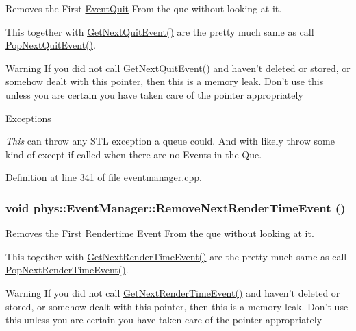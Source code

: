 Removes the First \hyperlink{classphys_1_1EventQuit}{EventQuit} From the que without looking at it. 

This together with \hyperlink{classphys_1_1EventManager_ad7da09e5422b1db79ac4187ee9198d0c}{GetNextQuitEvent()} are the pretty much same as call \hyperlink{classphys_1_1EventManager_a9b0d8e4d76fef35423bb862d7127b747}{PopNextQuitEvent()}. \begin{DoxyWarning}{Warning}
If you did not call \hyperlink{classphys_1_1EventManager_ad7da09e5422b1db79ac4187ee9198d0c}{GetNextQuitEvent()} and haven't deleted or stored, or somehow dealt with this pointer, then this is a memory leak. Don't use this unless you are certain you have taken care of the pointer appropriately 
\end{DoxyWarning}

\begin{DoxyExceptions}{Exceptions}
\item[{\em This}]can throw any STL exception a queue could. And with likely throw some kind of except if called when there are no Events in the Que. \end{DoxyExceptions}


Definition at line 341 of file eventmanager.cpp.

\hypertarget{classphys_1_1EventManager_af1204912be3554312e66d3a777c1f99b}{
\subsubsection[{RemoveNextRenderTimeEvent}]{\setlength{\rightskip}{0pt plus 5cm}void phys::EventManager::RemoveNextRenderTimeEvent ()}}
\label{da/dde/classphys_1_1EventManager_af1204912be3554312e66d3a777c1f99b}


Removes the First Rendertime Event From the que without looking at it. 

This together with \hyperlink{classphys_1_1EventManager_ae8730b039a280449af052d75f2e60b06}{GetNextRenderTimeEvent()} are the pretty much same as call \hyperlink{classphys_1_1EventManager_aa7e800d34ad8b9295ac87dfa822a2a03}{PopNextRenderTimeEvent()}. \begin{DoxyWarning}{Warning}
If you did not call \hyperlink{classphys_1_1EventManager_ae8730b039a280449af052d75f2e60b06}{GetNextRenderTimeEvent()} and haven't deleted or stored, or somehow dealt with this pointer, then this is a memory leak. Don't use this unless you are certain you have taken care of the pointer appropriately 
\end{DoxyWarning}

